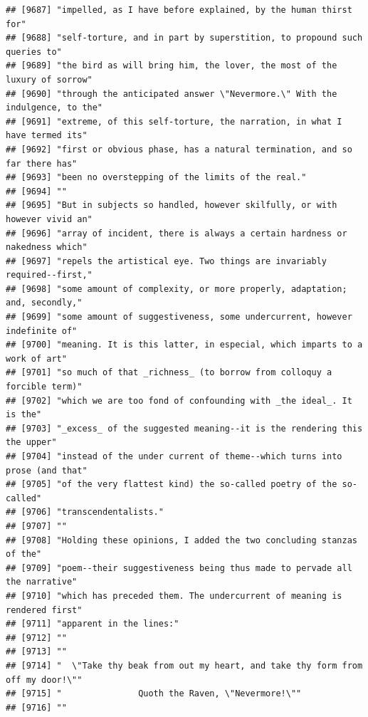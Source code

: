 \documentclass{article}\usepackage[]{graphicx}\usepackage[]{color}
\makeatletter
\newenvironment{kframe}{%
 \def\at@end@of@kframe{}%
 \ifinner\ifhmode%
  \def\at@end@of@kframe{\end{minipage}}%
  \begin{minipage}{\columnwidth}%
 \fi\fi%
 \def\FrameCommand##1{\hskip\@totalleftmargin \hskip-\fboxsep
 \colorbox{shadecolor}{##1}\hskip-\fboxsep
     \hskip-\linewidth \hskip-\@totalleftmargin \hskip\columnwidth}%
 \MakeFramed {\advance\hsize-\width
   \@totalleftmargin\z@ \linewidth\hsize
   \@setminipage}}%
 {\par\unskip\endMakeFramed%
 \at@end@of@kframe}
\newenvironment{knitrout}{}{} %
\makeatother
\begin{document}
\begin{knitrout}
\begin{kframe}
\begin{verbatim}
## [9687] "impelled, as I have before explained, by the human thirst for"               
## [9688] "self-torture, and in part by superstition, to propound such queries to"      
## [9689] "the bird as will bring him, the lover, the most of the luxury of sorrow"     
## [9690] "through the anticipated answer \"Nevermore.\" With the indulgence, to the"   
## [9691] "extreme, of this self-torture, the narration, in what I have termed its"     
## [9692] "first or obvious phase, has a natural termination, and so far there has"     
## [9693] "been no overstepping of the limits of the real."                             
## [9694] ""                                                                            
## [9695] "But in subjects so handled, however skilfully, or with however vivid an"     
## [9696] "array of incident, there is always a certain hardness or nakedness which"    
## [9697] "repels the artistical eye. Two things are invariably required--first,"       
## [9698] "some amount of complexity, or more properly, adaptation; and, secondly,"     
## [9699] "some amount of suggestiveness, some undercurrent, however indefinite of"     
## [9700] "meaning. It is this latter, in especial, which imparts to a work of art"     
## [9701] "so much of that _richness_ (to borrow from colloquy a forcible term)"        
## [9702] "which we are too fond of confounding with _the ideal_. It is the"            
## [9703] "_excess_ of the suggested meaning--it is the rendering this the upper"       
## [9704] "instead of the under current of theme--which turns into prose (and that"     
## [9705] "of the very flattest kind) the so-called poetry of the so-called"            
## [9706] "transcendentalists."                                                         
## [9707] ""                                                                            
## [9708] "Holding these opinions, I added the two concluding stanzas of the"           
## [9709] "poem--their suggestiveness being thus made to pervade all the narrative"     
## [9710] "which has preceded them. The undercurrent of meaning is rendered first"      
## [9711] "apparent in the lines:"                                                      
## [9712] ""                                                                            
## [9713] ""                                                                            
## [9714] "  \"Take thy beak from out my heart, and take thy form from off my door!\""  
## [9715] "               Quoth the Raven, \"Nevermore!\""                              
## [9716] ""                                                                            

\end{verbatim}
\end{kframe}
\end{knitrout}
\end{document}

